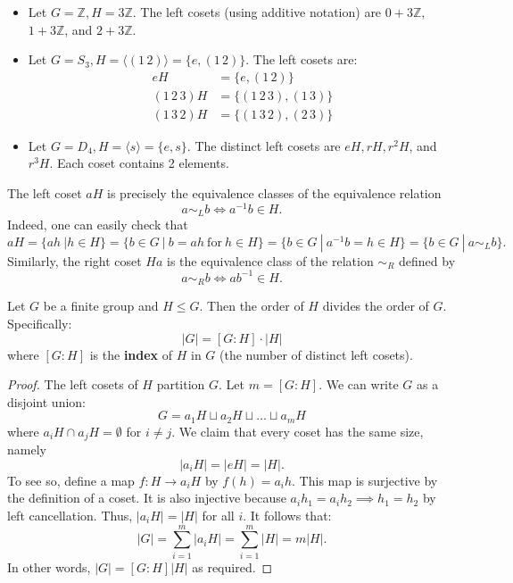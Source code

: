 \begin{example}
\begin{itemize}
    \item Let $G = \mathbb{Z}, H = 3\mathbb{Z}$. The left cosets (using additive notation) are $0+3\mathbb{Z}$, $1+3\mathbb{Z}$, and $2+3\mathbb{Z}$.
    \item Let $G = S_3, H = \langle (1\,2) \rangle = \{e, (1\,2)\}$. The left cosets are:
    \begin{align*}
        eH &= \{e, (1\,2)\} \\
        (1\,2\,3)H &= \{(1\,2\,3), (1\,3)\} \\
        (1\,3\,2)H &= \{(1\,3\,2), (2\,3)\}
    \end{align*}
    \item Let $G = D_4, H = \langle s \rangle = \{e, s\}$. The distinct left cosets are $eH, rH, r^2H$, and $r^3H$. Each coset contains 2 elements.
\end{itemize}
\end{example}

\begin{remark}
The left coset $aH$ is precisely the equivalence classes of the equivalence relation 
$$a \sim_L b \iff a^{-1}b \in H.$$
Indeed, one can easily check that
$$aH = \{ah\ | h \in H\} = \{b \in G\ |\ b = ah\ \text{for}\ h \in H\} = \{b\in G\ |\ a^{-1}b = h \in H\}  = \{b \in G\ |\ a \sim_L b\}.$$
Similarly, the right coset $Ha$ is the equivalence class of the relation $\sim_R$ defined by
$$a \sim_R b \iff ab^{-1} \in H.$$
\end{remark}

\begin{theorem}
Let $G$ be a finite group and $H \le G$. Then the order of $H$ divides the order of $G$. Specifically:
$$|G| = [G : H] \cdot |H|$$
where $[G : H]$ is the \textbf{index} of $H$ in $G$ (the number of distinct left cosets).
\end{theorem}

\begin{proof}
The left cosets of $H$ partition $G$. Let $m = [G : H]$. We can write $G$ as a disjoint union:
$$G = a_1 H \sqcup a_2 H \sqcup \dots \sqcup a_m H$$
where $a_i H \cap a_j H = \emptyset$ for $i \neq j$. We claim that every coset has the same size, namely 
$$|a_i H| = |eH| = |H|.$$ 
To see so, define a map $f: H \to a_i H$ by $f(h) = a_i h$. This map is surjective by the definition of a coset. It is also injective because $a_i h_1 = a_i h_2 \implies h_1 = h_2$ by left cancellation. Thus, $|a_i H| = |H|$ for all $i$. It follows that:
$$|G| = \sum_{i=1}^m |a_i H| = \sum_{i=1}^m |H| = m|H|.$$
In other words, $|G| = [G : H] |H|$ as required.
\end{proof}

